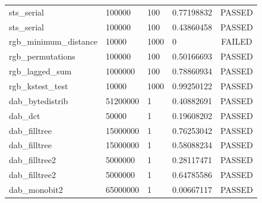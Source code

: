 \documentclass[titlepage, 11pt]{article}
\begin{document}
\begin{table}[!htb]
\begin{tabular}{l|l|l|l|c}
sts\_serial & 100000 & 100 & 0.77198832 & PASSED \\
sts\_serial & 100000 & 100 & 0.43860458 & PASSED \\
rgb\_minimum\_distance & 10000 & 1000 & 0 & FAILED \\
rgb\_permutations & 100000 & 100 & 0.50166693 & PASSED \\
rgb\_lagged\_sum & 1000000 & 100 & 0.78860934 & PASSED \\
rgb\_kstest\_test & 10000 & 1000 & 0.99250122 & PASSED \\
dab\_bytedistrib & 51200000 & 1 & 0.40882691 & PASSED \\
dab\_dct & 50000 & 1 & 0.19608202 & PASSED \\
dab\_filltree & 15000000 & 1 & 0.76253042 & PASSED \\
dab\_filltree & 15000000 & 1 & 0.58088234 & PASSED \\
dab\_filltree2 & 5000000 & 1 & 0.28117471 & PASSED \\
dab\_filltree2 & 5000000 & 1 & 0.64785586 & PASSED \\
dab\_monobit2 & 65000000 & 1 & 0.00667117 & PASSED
\end{tabular}
\end{table}
\end{document}
